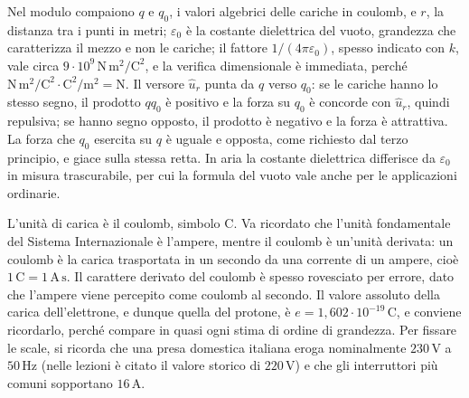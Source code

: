 \documentclass[11pt,a4paper]{article}
\newcommand{\epz}{\varepsilon_0}
\newcommand{\uv}{\hat{u}}
\begin{document}
Nel modulo compaiono $q$ e $q_0$, i valori algebrici delle cariche in coulomb, e $r$, la distanza tra i punti in metri; $\epz$ è la costante dielettrica del vuoto, grandezza che caratterizza il mezzo e non le cariche; il fattore $1/(4\pi\epz)$, spesso indicato con $k$, vale circa $\ensuremath{9\cdot 10^{9}\,\mathrm{N\,m^2/C^2}}$, e la verifica dimensionale è immediata, perché $\ensuremath{\mathrm{N\,m^2/C^2}}\cdot\ensuremath{\mathrm{C^2/m^2}}=\ensuremath{\mathrm{N}}$. Il versore $\uv_r$ punta da $q$ verso $q_0$: se le cariche hanno lo stesso segno, il prodotto $qq_0$ è positivo e la forza su $q_0$ è concorde con $\uv_r$, quindi repulsiva; se hanno segno opposto, il prodotto è negativo e la forza è attrattiva. La forza che $q_0$ esercita su $q$ è uguale e opposta, come richiesto dal terzo principio, e giace sulla stessa retta. In aria la costante dielettrica differisce da $\epz$ in misura trascurabile, per cui la formula del vuoto vale anche per le applicazioni ordinarie.

L'unità di carica è il coulomb, simbolo $\ensuremath{\mathrm{C}}$. Va ricordato che l'unità fondamentale del Sistema Internazionale è l'ampere, mentre il coulomb è un'unità derivata: un coulomb è la carica trasportata in un secondo da una corrente di un ampere, cioè $\ensuremath{1\,\mathrm{C}}=\ensuremath{1\,\mathrm{A\,s}}$. Il carattere derivato del coulomb è spesso rovesciato per errore, dato che l'ampere viene percepito come coulomb al secondo. Il valore assoluto della carica dell'elettrone, e dunque quella del protone, è $e=\ensuremath{1,602\cdot 10^{-19}\,\mathrm{C}}$, e conviene ricordarlo, perché compare in quasi ogni stima di ordine di grandezza. Per fissare le scale, si ricorda che una presa domestica italiana eroga nominalmente $\ensuremath{230\,\mathrm{V}}$ a $\ensuremath{50\,\mathrm{Hz}}$ (nelle lezioni è citato il valore storico di $\ensuremath{220\,\mathrm{V}}$) e che gli interruttori più comuni sopportano $\ensuremath{16\,\mathrm{A}}$.
\end{document}
